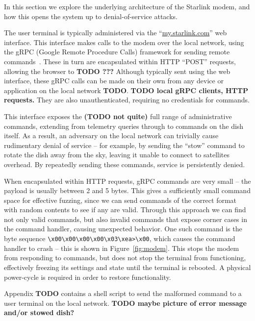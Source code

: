 In this section we explore the underlying architecture of the Starlink modem, and how this opens the system up to denial-of-service attacks.

The user terminal is typically administered via the ``\url{my.starlink.com}'' web interface.
This interface makes calls to the modem over the local network, using the gRPC (Google Remote Procedure Calls) framework for sending remote commands~\cite{gRPC}.
These in turn are encapsulated within HTTP ``POST'' requests, allowing the browser to \textbf{TODO ???}
Although typically sent using the web interface, these gRPC calls can be made on their own from any device or application on the local network \textbf{TODO}.
\textbf{TODO local gRPC clients, HTTP requests.}
They are also unauthenticated, requiring no credentials for commands.

This interface exposes the \textbf{(TODO not quite)} full range of administrative commands, extending from telemetry queries through to commands on the dish itself.
As a result, an adversary on the local network can trivially cause rudimentary denial of service -- for example, by sending the ``stow'' command to rotate the dish away from the sky, leaving it unable to connect to satellites overhead.
By repeatedly sending these commands, service is persistently denied.

When encapsulated within HTTP requests, gRPC commands are very small -- the payload is usually between 2 and 5 bytes.
This gives a sufficiently small command space for effective fuzzing, since we can send commands of the correct format with random contents to see if any are valid.
Through this approach we can find not only valid commands, but also invalid commands that expose corner cases in the command handler, causing unexpected behavior.
One such command is the byte sequence \lstinline{\x00\x00\x00\x00\x03\xea>\x00}, which causes the command handler to crash -- this is shown in Figure~\ref{fig:modem}.
This stops the modem from responding to commands, but does not stop the terminal from functioning, effectively freezing its settings and state until the terminal is rebooted.
A physical power-cycle is required in order to restore functionality.

Appendix \textbf{TODO} contains a shell script to send the malformed command to a user terminal on the local network.
\textbf{TODO maybe picture of error message and/or stowed dish?}